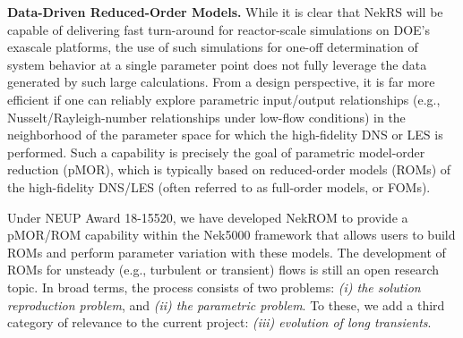

\noindent
{\bf Data-Driven Reduced-Order Models.}
While it is clear that NekRS will be capable of delivering fast turn-around
for reactor-scale simulations on DOE's exascale platforms, the use of
such simulations for one-off determination of system behavior at a single
parameter point does not fully leverage the data generated by such large
calculations.
From a design perspective, it is far more efficient if one can reliably
explore parametric input/output relationships (e.g., Nusselt/Rayleigh-number
relationships under low-flow conditions) in the neighborhood of the parameter
space for which the high-fidelity DNS or LES is performed.   Such a capability
is precisely the goal of parametric model-order reduction (pMOR), which is
typically based on reduced-order models (ROMs) of the high-fidelity DNS/LES
(often referred to as full-order models, or FOMs).

Under NEUP Award 18-15520, we have developed NekROM to provide a
pMOR/ROM capability within the Nek5000 framework that allows users to build
ROMs and perform parameter variation with these models.  The development of
ROMs for unsteady (e.g., turbulent or transient) flows is still an open
research topic.  In broad terms, the process consists of two problems: {\em (i)
the solution reproduction problem}, and {\em (ii) the parametric problem}.  To
these, we add a third category of relevance to the current project: {\em (iii)
evolution of long transients}.

